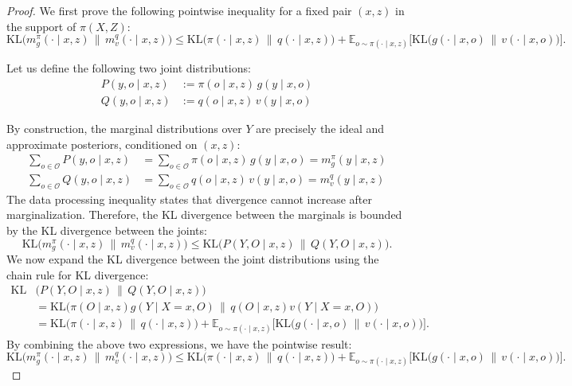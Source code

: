 \documentclass{article}
\theoremstyle{plain}
\begin{document}
\begin{proof}
We first prove the following pointwise inequality for a fixed pair $(x,z)$ in the support of $\pi(X,Z)$:
\[
\mathrm{KL}\!\big(m_g^{\pi}(\cdot \mid x,z)\,\big\|\,m_v^{q}(\cdot \mid x,z)\big) \le \mathrm{KL}\!\big(\pi(\cdot \mid x,z)\,\big\|\,q(\cdot \mid x,z)\big) + \mathbb{E}_{o\sim \pi(\cdot \mid x,z)} \big[\mathrm{KL}\!\big(g(\cdot\mid x,o)\,\big\|\,v(\cdot\mid x,o)\big)\big].
\]

Let us define the following two joint distributions:
\begin{align*}
    P(y,o \mid x,z) &:= \pi(o \mid x,z) \, g(y \mid x,o) \\
    Q(y,o \mid x,z) &:= q(o \mid x,z) \, v(y \mid x,o)
\end{align*}

By construction, the marginal distributions over $Y$ are precisely the ideal and approximate posteriors, conditioned on $(x,z)$:
\begin{align*}
    \sum_{o \in \mathcal{O}} P(y,o \mid x,z) &= \sum_{o \in \mathcal{O}} \pi(o \mid x,z) \, g(y \mid x,o) = m_g^{\pi}(y \mid x,z) \\
    \sum_{o \in \mathcal{O}} Q(y,o \mid x,z) &= \sum_{o \in \mathcal{O}} q(o \mid x,z) \, v(y \mid x,o) = m_v^{q}(y \mid x,z)
\end{align*}
The data processing inequality states that divergence cannot increase after marginalization.
Therefore, the KL divergence between the marginals is bounded by the KL divergence between the joints:
\[
\mathrm{KL}\!\big(m_g^{\pi}(\cdot \mid x,z)\,\big\|\,m_v^{q}(\cdot \mid x,z)\big) \le \mathrm{KL}\!\big(P(Y,O \mid x,z)\,\big\|\,Q(Y,O \mid x,z)\big).
\]
We now expand the KL divergence between the joint distributions using the chain rule for KL divergence:
\begin{align*}
\mathrm{KL} & \!\big(P(Y,O \mid x,z)\,\big\|\,Q(Y,O \mid x,z)\big) \\
&= \mathrm{KL}\!\big(\pi(O \mid x,z)g(Y \mid X=x,O)\,\big\|\,q(O \mid x,z)v(Y \mid X=x,O)\big) \\
&= \mathrm{KL}\!\big(\pi(\cdot \mid x,z)\,\big\|\,q(\cdot \mid x,z)\big) + \mathbb{E}_{o \sim \pi(\cdot \mid x,z)} \big[ \mathrm{KL}\!\big(g(\cdot \mid x,o)\,\big\|\,v(\cdot \mid x,o)\big) \big].
\end{align*}
By combining the above two expressions, we have the pointwise result:
\[
\mathrm{KL}\!\big(m_g^{\pi}(\cdot \mid x,z)\,\big\|\,m_v^{q}(\cdot \mid x,z)\big) \le \mathrm{KL}\!\big(\pi(\cdot \mid x,z)\,\big\|\,q(\cdot \mid x,z)\big) + \mathbb{E}_{o\sim \pi(\cdot \mid x,z)} \big[\mathrm{KL}\!\big(g(\cdot\mid x,o)\,\big\|\,v(\cdot\mid x,o)\big)\big].
\]
\end{proof}
\end{document}
